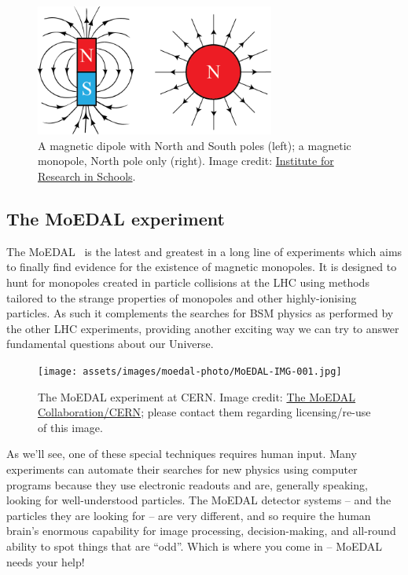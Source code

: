 %
\begin{figure}[htbp]
  \centering
  \includegraphics[width=0.7\textwidth]{assets/images/dipole-vs-monopole/dipole-vs-monopole.png}
  \caption[A magnetic dipole and monopole]
  {\label{fig:dipolemonopole}A magnetic dipole with North and South poles (left); a magnetic monopole, North pole only (right).  Image credit: \href{http://researchinschools.org}{Institute for Research in Schools}.}
\end{figure}
%

\subsection{The MoEDAL experiment}
\label{sec:moedalintro}
The \acf{MoEDAL}~\cite{MoEDAL2009}
is the latest and greatest in a long line of experiments which aims to
finally find evidence for the existence of magnetic monopoles.
%
It is designed to hunt for monopoles created in particle collisions
at the LHC using methods tailored to the strange properties of monopoles
and other highly-ionising particles.
As such it complements the searches for \ac{BSM} physics as performed by
the other LHC experiments,
providing another exciting way we can try to answer fundamental questions 
about our Universe.

%
\begin{figure}[htbp]
  \centering
  \texttt{[image: assets/images/moedal-photo/MoEDAL-IMG-001.jpg]}
  \caption[The MoEDAL experiment at CERN]
  {\label{fig:moedalphoto}The MoEDAL experiment at CERN.
Image credit: \href{http://moedal.web.cern.ch/}{The MoEDAL Collaboration/CERN};
please contact them regarding licensing/re-use of this image.}
\end{figure}
%

As we'll see,
one of these special techniques requires human input.
Many experiments can automate their searches for new physics using computer
programs because they use electronic readouts and are, generally speaking,
looking for well-understood particles.
%
The MoEDAL detector systems -- and the particles they are
looking for -- are very different,
and so require the human brain's enormous capability for image processing,
decision-making, and all-round ability to spot things that are ``odd''.
Which is where you come in -- MoEDAL needs your help!


